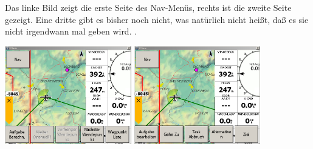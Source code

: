 Das linke Bild zeigt die erste Seite des \textsf{Nav}-Menüs, rechts ist die zweite Seite gezeigt. Eine dritte gibt es bisher noch nicht, was natürlich nicht heißt, daß es sie nicht irgendwann mal geben wird. .
\begin{center}
\includegraphics[width=5.5cm]{Bilder/Nav-Menu1.png}
\qquad
\includegraphics[width=5.5cm]{Bilder/Nav-Menu2.png}
\end{center}

